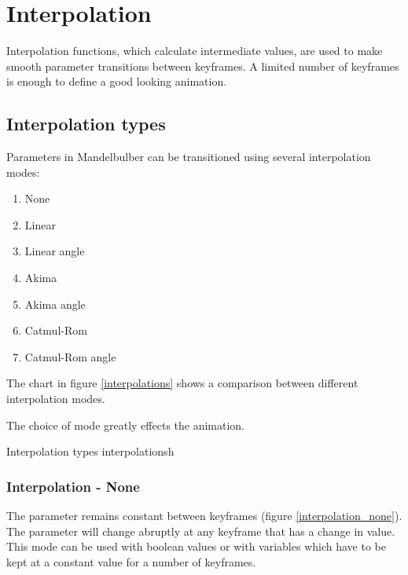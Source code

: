 \section{Interpolation}\label{interpolation}

Interpolation functions, which calculate intermediate values, are used to make smooth parameter transitions between keyframes. A limited number of keyframes is enough to define a good looking animation.

\subsection{Interpolation types}\label{interpolation-types}

Parameters in Mandelbulber can be transitioned using several interpolation modes:

\begin{multicols}{3}
\begin{enumerate}
	
	\item None

	\item Linear

	\item Linear angle
	
	\item Akima	

	\item Akima angle
	
	\item Catmul-Rom

	\item Catmul-Rom angle
	
\end{enumerate}
\end{multicols}

The chart in figure \ref{interpolations} shows a comparison between different interpolation modes.

The choice of mode greatly effects the animation.

{Interpolation types}
{interpolations}{h}

\subsubsection{Interpolation - None}\label{interpolation-none}

The parameter remains constant between keyframes (figure \ref{interpolation_none}). The parameter will change abruptly at any keyframe that has a change in value. This mode can be used with boolean values or with variables
which have to be kept at a constant value for a number of keyframes.

